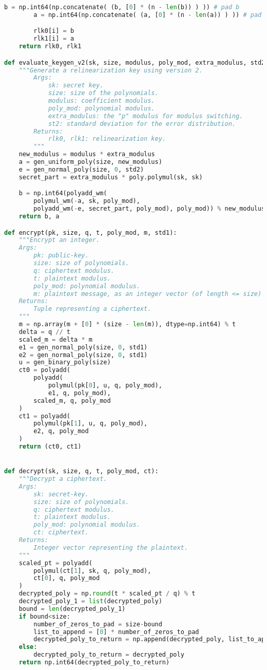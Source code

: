 \documentclass{article}
\begin{document}
\begin{lstlisting}[language=Python]
        b = np.int64(np.concatenate( (b, [0] * (n - len(b)) ) )) # pad b
        a = np.int64(np.concatenate( (a, [0] * (n - len(a)) ) )) # pad a

        rlk0[i] = b
        rlk1[i] = a
    return rlk0, rlk1

def evaluate_keygen_v2(sk, size, modulus, poly_mod, extra_modulus, std2):
    """Generate a relinearization key using version 2.
        Args:
            sk: secret key.
            size: size of the polynomials.
            modulus: coefficient modulus.
            poly_mod: polynomial modulus.
            extra_modulus: the "p" modulus for modulus switching.
            st2: standard deviation for the error distribution.
        Returns:
            rlk0, rlk1: relinearization key.
        """
    new_modulus = modulus * extra_modulus
    a = gen_uniform_poly(size, new_modulus)
    e = gen_normal_poly(size, 0, std2)
    secret_part = extra_modulus * poly.polymul(sk, sk)

    b = np.int64(polyadd_wm(
        polymul_wm(-a, sk, poly_mod),
        polyadd_wm(-e, secret_part, poly_mod), poly_mod)) % new_modulus
    return b, a

def encrypt(pk, size, q, t, poly_mod, m, std1):
    """Encrypt an integer.
    Args:
        pk: public-key.
        size: size of polynomials.
        q: ciphertext modulus.
        t: plaintext modulus.
        poly_mod: polynomial modulus.
        m: plaintext message, as an integer vector (of length <= size) with entries mod t.
    Returns:
        Tuple representing a ciphertext.
    """
    m = np.array(m + [0] * (size - len(m)), dtype=np.int64) % t
    delta = q // t
    scaled_m = delta * m
    e1 = gen_normal_poly(size, 0, std1)
    e2 = gen_normal_poly(size, 0, std1)
    u = gen_binary_poly(size)
    ct0 = polyadd(
        polyadd(
            polymul(pk[0], u, q, poly_mod),
            e1, q, poly_mod),
        scaled_m, q, poly_mod
    )
    ct1 = polyadd(
        polymul(pk[1], u, q, poly_mod),
        e2, q, poly_mod
    )
    return (ct0, ct1)


def decrypt(sk, size, q, t, poly_mod, ct):
    """Decrypt a ciphertext.
    Args:
        sk: secret-key.
        size: size of polynomials.
        q: ciphertext modulus.
        t: plaintext modulus.
        poly_mod: polynomial modulus.
        ct: ciphertext.
    Returns:
        Integer vector representing the plaintext.
    """
    scaled_pt = polyadd(
        polymul(ct[1], sk, q, poly_mod),
        ct[0], q, poly_mod
    )
    decrypted_poly = np.round(t * scaled_pt / q) % t
    decrypted_poly_1 = list(decrypted_poly)
    bound = len(decrypted_poly_1)
    if bound<size:
        number_of_zeros_to_pad = size-bound
        list_to_append = [0] * number_of_zeros_to_pad
        decrypted_poly_to_return = np.append(decrypted_poly, list_to_append) #pad with 0
    else:
        decrypted_poly_to_return = decrypted_poly
    return np.int64(decrypted_poly_to_return)


\end{lstlisting}
\end{document}

